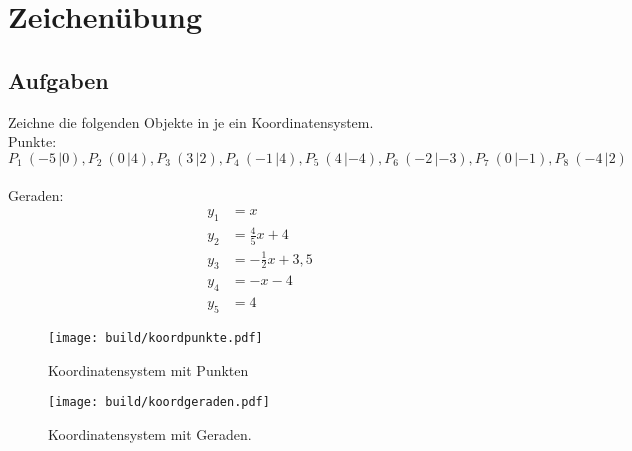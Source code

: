 


    \section*{Zeichenübung}
    \subsection*{Aufgaben}
    Zeichne die folgenden Objekte in je ein Koordinatensystem.\\
    Punkte:\\
    $P_1 \: ( -5 \, |  0),
     P_2 \: (  0 \, |  4),
     P_3 \: (  3 \, |  2),
     P_4 \: ( -1 \, |  4),
     P_5 \: (  4 \, | -4),
     P_6 \: ( -2 \, | -3),
     P_7 \: (  0 \, | -1),
     P_8 \: ( -4 \, |  2)$
    \\~\\
    Geraden:
    \begin{align}
        y_1 &= x\\
        y_2 &= \frac{4}{5}x +4 \\
        y_3 &= -\frac{1}{2}x +3,5 \\
        y_4 &= -x -4 \\
        y_5 &= 4
    \end{align}
    \begin{figure}
        \centering
        \texttt{[image: build/koordpunkte.pdf]}
        \caption{Koordinatensystem mit Punkten}
    \end{figure}
    \begin{figure}
        \centering
        \texttt{[image: build/koordgeraden.pdf]}
        \caption{Koordinatensystem mit Geraden.}
    \end{figure}

